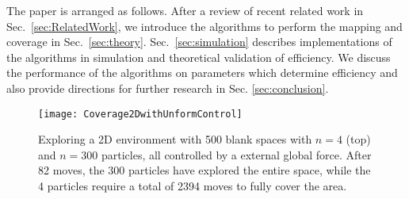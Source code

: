 The paper is arranged as follows. 
After a review of recent related work in Sec.~\ref{sec:RelatedWork}, we introduce the algorithms to perform the mapping and coverage in Sec.~\ref{sec:theory}.
 Sec.~\ref{sec:simulation} describes implementations of the algorithms in simulation and theoretical validation of efficiency. 
  We discuss the performance of the algorithms on parameters which determine efficiency and also provide directions for further research in Sec.  \ref{sec:conclusion}.

\begin{figure}
\begin{center}
	\texttt{[image: Coverage2DwithUnformControl]}
\end{center}
\caption{\label{fig:Coverage2DwithUnformControl}
Exploring a 2D environment with 500 blank spaces with $n=4$ (top) and $n=300$ particles, all controlled by a external global force.  After 82 moves, the 300 particles have explored the entire space, while the 4 particles require a total of 2394 moves to fully cover the area. 
}
\end{figure}

